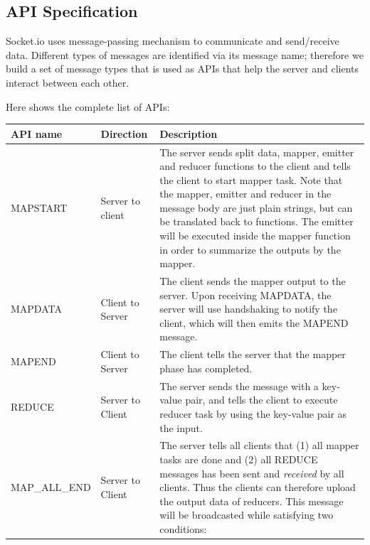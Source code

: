 \subsection{API Specification}

Socket.io uses message-passing mechanism to communicate and send/receive data. Different types of messages are identified via its message name; therefore we build a set of message types that is used as APIs that help the server and clients interact between each other.

Here shows the complete list of APIs:

\begin{center}

\begin{tabular}{| l | l | p{7.5cm} |}

\hline
API name & Direction & Description \\
\hline
MAPSTART & Server to client & The server sends split data, mapper, emitter and reducer functions to the client and tells the client to start mapper task. \newline
Note that the mapper, emitter and reducer in the message body are just plain strings, but can be translated back to functions. \newline
The emitter will be executed inside the mapper function in order to summarize the outputs by the mapper. \\
\hline
MAPDATA & Client to Server & The client sends the mapper output to the server. \newline
Upon receiving MAPDATA, the server will use handshaking to notify the client, which will then emits the MAPEND message. \\
\hline
MAPEND & Client to Server & The client tells the server that the mapper phase has completed. \\
\hline
REDUCE & Server to Client & The server sends the message with a key-value pair, and tells the client to execute reducer task by using the key-value pair as the input. \\
\hline
MAP\_ALL\_END & Server to Client & The server tells all clients that \newline
(1) all mapper tasks are done and \newline
(2) all REDUCE messages has been sent and \emph{received} by all clients. \newline
Thus the clients can therefore upload the output data of reducers. \newline
This message will be broadcasted while satisfying two conditions: \newline

\end{tabular}
\end{center}
